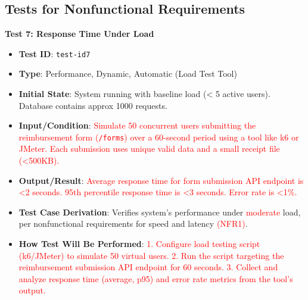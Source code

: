 \documentclass[12pt, titlepage]{article}
\begin{document}
\subsection{Tests for Nonfunctional Requirements} \label{sec:NonfunctionalReqEval}

\textbf{Test 7: Response Time Under Load} \label{test-id7}
\begin{itemize}
    \item \textbf{Test ID}: \texttt{test-id7}
    \item \textbf{Type}: Performance, Dynamic, Automatic (Load Test Tool)
    \item \textbf{Initial State}: System running with baseline load (\textless{} 5 active users). Database contains approx 1000 requests.
    \item \textbf{Input/Condition}: \textcolor{red}{Simulate 50 concurrent users submitting the reimbursement form (\texttt{/forms}) over a 60-second period using a tool like k6 or JMeter. Each submission uses unique valid data and a small receipt file (\textless 500KB).}
    \item \textbf{Output/Result}: \textcolor{red}{Average response time for form submission API endpoint is \textless 2 seconds. 95th percentile response time is \textless 3 seconds. Error rate is \textless 1\%.}
    \item \textbf{Test Case Derivation}: Verifies system’s performance under \textcolor{red}{moderate} load, per nonfunctional requirements for speed and latency \textcolor{red}{(NFR1)}.
    \item \textbf{How Test Will Be Performed}: \textcolor{red}{1. Configure load testing script (k6/JMeter) to simulate 50 virtual users. 2. Run the script targeting the reimbursement submission API endpoint for 60 seconds. 3. Collect and analyze response time (average, p95) and error rate metrics from the tool's output.}
\end{itemize}
\end{document}
